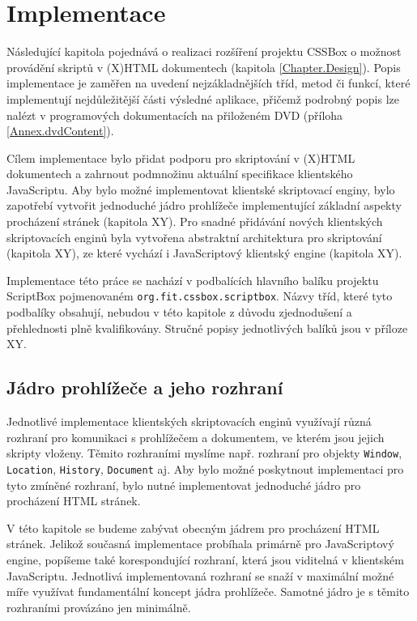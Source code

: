 \chapter{Implementace}
\label{Chapter.Implementation}

Následující kapitola pojednává o realizaci rozšíření projektu CSSBox o možnost provádění skriptů v (X)HTML dokumentech (kapitola \ref{Chapter.Design}). Popis implementace je zaměřen na uvedení nejzákladnějších tříd, metod či funkcí, které implementují nejdůležitější části výsledné aplikace, přičemž podrobný popis lze nalézt v programových dokumentacích na přiloženém DVD (příloha \ref{Annex.dvdContent}).

Cílem implementace bylo přidat podporu pro skriptování v (X)HTML dokumentech a zahrnout podmnožinu aktuální specifikace klientského JavaScriptu. Aby bylo možné implementovat klientské skriptovací enginy, bylo zapotřebí vytvořit jednoduché jádro prohlížeče implementující základní aspekty procházení stránek (kapitola XY). Pro snadné přidávání nových klientských skriptovacích enginů byla vytvořena abstraktní architektura pro skriptování (kapitola XY), ze které vychází i JavaScriptový klientský engine (kapitola XY).

Implementace této práce se nachází v podbalících hlavního balíku projektu ScriptBox pojmenovaném \texttt{org.fit.cssbox.scriptbox}.  Názvy tříd, které tyto podbalíky obsahují, nebudou v této kapitole z důvodu zjednodušení a přehlednosti plně kvalifikovány. Stručné popisy jednotlivých balíků jsou v příloze XY.

\section{Jádro prohlížeče a jeho rozhraní}
\label{Chapter.Implementation.BrowsingCore}

Jednotlivé implementace klientských skriptovacích enginů využívají různá rozhraní pro komunikaci s prohlížečem a dokumentem, ve kterém jsou jejich skripty vloženy. Těmito rozhraními myslíme např. rozhraní pro objekty \texttt{Window}, \texttt{Location}, \texttt{History}, \texttt{Document} aj. Aby bylo možné poskytnout implementaci pro tyto zmíněné rozhraní, bylo nutné implementovat jednoduché jádro pro procházení HTML stránek.

V této kapitole se budeme zabývat obecným jádrem pro procházení HTML stránek. Jelikož současná implementace probíhala primárně pro JavaScriptový engine, popíšeme také korespondující rozhraní, která jsou viditelná v klientském JavaScriptu. Jednotlivá implementovaná rozhraní se snaží v maximální možné míře využívat fundamentální koncept jádra prohlížeče. Samotné jádro je s těmito rozhraními provázáno jen minimálně.

